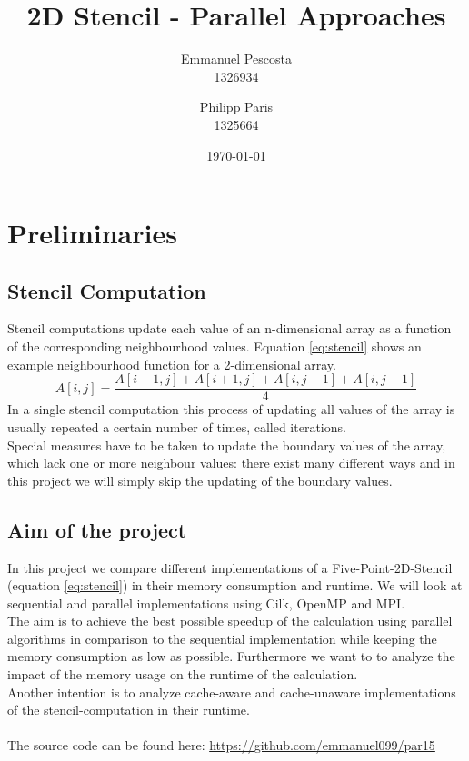 \documentclass[11pt,a4paper]{article}
\title{2D Stencil - Parallel Approaches}
\author{
  Emmanuel Pescosta\\
  1326934 
  \and
  Philipp Paris\\
  1325664
}
\date{\today}
\begin{document}
\maketitle

\section{Preliminaries}

\subsection{Stencil Computation}
Stencil computations update each value of an n-dimensional array as a function of the corresponding neighbourhood values. Equation \ref{eq:stencil} shows an example neighbourhood function for a 2-dimensional array.
\begin{equation}\label{eq:stencil}
 A[i,j] = \frac{A[i-1,j] + A[i+1,j] + A[i,j-1] + A[i,j+1]}{4}
\end{equation}
In a single stencil computation this process of updating all values of the array is usually repeated a certain number of times, called iterations. \\
Special measures have to be taken to update the boundary values of the array, which lack one or more neighbour values: there exist many different ways and in this project we will simply skip the updating of the boundary values.

\subsection{Aim of the project}
In this project we compare different implementations of a Five-Point-2D-Stencil (equation \ref{eq:stencil}) in their memory consumption and runtime. We will look at sequential and parallel implementations using Cilk, OpenMP and MPI.\\
The aim is to achieve the best possible speedup of the calculation using parallel algorithms in comparison to the sequential implementation while keeping the memory consumption as low as possible. Furthermore we want to to analyze the impact of the memory usage on the runtime of the calculation.\\
Another intention is to analyze cache-aware and cache-unaware implementations of the stencil-computation in their runtime.\\
\\
The source code can be found here: \url{https://github.com/emmanuel099/par15}
\end{document}
